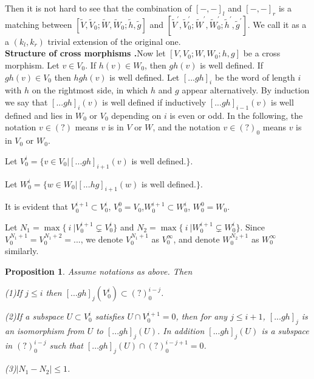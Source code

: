 \def\CTEXPreproc{Created by ctex v0.2.12, don't edit!}\documentclass[11pt]{article}
\newtheorem{prop}{Proposition}[section]
\begin{document}
 Then it is not hard to see that the combination of $[-,-]_l$ and $[-,-]_r$ is a matching  between $[ \tilde{V} , \tilde{V}_0 ; \tilde{W} ,\tilde{W}_0 ; \tilde{h} , \tilde{g}]$ and $[ \tilde{V}^{'} , \tilde{V}^{'}_0 ; \tilde{W}^{'} , \tilde{W}^{'}_0; \tilde{h}^{'} , \tilde{g}^{'}  ]   $. We call it as a a $(k_l ,k_r)$ trivial extension of the original one.\\





\noindent \textbf{Structure of cross morphisms .}Now let $[V, V_0 ; W, W_0 ; h,g   ]$ be a cross morphism. Let $v\in V_0$. If $h(v)\in W_0$, then $gh(v)$ is well defined. If $gh(v)\in V_0$ then
$hgh(v)$ is well defined. Let $[...gh]_i $ be the word of length $i$ with $h$ on the rightmost side, in which $h$ and $g$ appear alternatively. By induction we say that $[...gh]_i (v)$
is well defined if inductively $[...gh]_{i-1}(v)$ is well defined and lies in $W_0 $ or $V_0 $ depending on $i$ is even or odd. In the following, the
 notation $v\in (?)$ means $v$ is in $V$ or $W$, and  the notation  $v\in (?)_0 $ means $v$ is in $V_0$ or $W_0$.

Let $V^i _0 = \{ v\in V_0 | [...gh]_{i+1} (v) $ is well defined.$ \}$.

Let $W^i _0 = \{ w\in W_0 | [...hg]_{i+1} (w) $ is well defined.$ \}$.

It is evident that $V^{i+1}_0 \subset V^i _0$, $V^0 _0 = V_0$,$W^{i+1}_0 \subset W^i _0$, $W^0 _0 = W_0$.

Let $N_1 = \max \{\  i\  |  V^{i+1}_0 \subsetneq V^i _0   \}$ and  $N_2 = \max \{\  i\  |  W^{i+1}_0 \subsetneq W^i _0   \}$. Since $V^{N_1 +1}_0 = V^{N_1 +2}_0
=...$, we denote $ V^{N_1 +1}_0 $ as $V^{\infty}_0 $, and   denote $W^{N_2 +1}_0  $ as $ W^{\infty} _0 $ similarly.

\begin{prop} Assume notations as above. Then

\noindent(1)If $j\leq i$ then  $[...gh]_j (V^i _0 )\subset (?)^{i-j}_0 $.

\noindent(2)If a subspace  $U \subset V^{i}_0 $ satisfies $U\cap V^{i+1}_0 =0$, then for any $j\leq i+1$, $[...gh]_j$ is an isomorphism from $U$ to $ [...gh]_j (U)$. In addition $[...gh]_j (U) $ is a subspace in $(?)^{i-j} _0$ such that $[...gh]_j (U)\cap (?)^{i-j+1} _0 =0  $.

\noindent(3)$|N_1 -N_2 |\leq 1$.

\end{prop}
\end{document}
